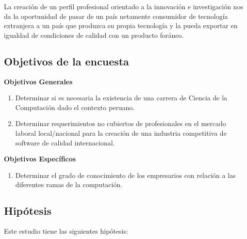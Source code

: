 La creación de un perfil profesional orientado a la innovación e investigación nos da la oportunidad de pasar de un país netamente consumidor de tecnología extranjera a un país que produzca su propia tecnología y la pueda exportar en igualdad de condiciones de calidad con un producto foráneo.

\subsection{Objetivos de la encuesta}

\textbf{Objetivos Generales}
\begin{enumerate}
\item Determinar si es necesaria la existencia de una carrera de Ciencia de la Computación dado el contexto peruano.
\item Determinar requerimientos no cubiertos de profesionales en el mercado laboral local/nacional para la creación de una industria competitiva de software de calidad internacional.
\end{enumerate}

\textbf{Objetivos Específicos}
\begin{enumerate}
 \item Determinar el grado de conocimiento de los empresarios con relación a las diferentes ramas de la computación.
\end{enumerate}

\subsection{Hipótesis}
Este estudio tiene las siguientes hipótesis:

